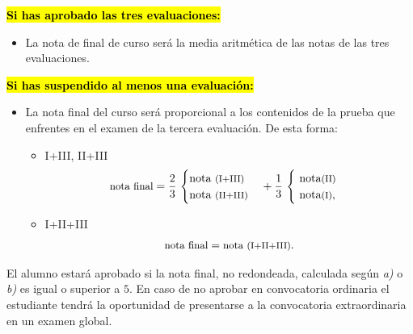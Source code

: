 \documentclass[a5paper,12pt]{extarticle}
\begin{document}
	{\small
	
	\textbf{\hl{Si has aprobado las tres evaluaciones:}}
	\vspace{-1ex}
	
	\begin{itemize}
		\item[\textit{a)}] La nota de final de curso será la media aritm\'etica de las notas de las tres evaluaciones. 
	\end{itemize}
	
	\textbf{\hl{Si has suspendido al menos una evaluaci\'on:}}
	\vspace{-1ex}
	\begin{itemize}
		\item[\textit{b)}] La nota final del curso será proporcional a los contenidos de la prueba que enfrentes en el examen de la tercera evaluación. De esta forma:
			\begin{itemize}
			
				\item \footnotesize{I+III, II+III}
				\[
				\text{\small nota final}=\frac{2}{3}\,
					\begin{cases}
						\text{nota {\footnotesize(I+III)}}\\
						\text{nota {\footnotesize(II+III)}}
					\end{cases}
									+\frac{1}{3}\,
					\begin{cases}
						\text{ nota{\footnotesize(II)}}\\
						\text{ nota{\footnotesize(I)}},
					\end{cases}		
				\]							
				\item \footnotesize{I+II+III}
				\[
				\text{\small nota final}=\text{\small nota \footnotesize{(I+II+III)}}.
				\]
			
			\end{itemize}
	
	\end{itemize}
 }
 
  El alumno estará aprobado si la nota final, no redondeada, calculada según \textit{a)} o  \textit{b)} es igual o superior a $5$. En caso de no aprobar en convocatoria ordinaria el estudiante tendrá la oportunidad de presentarse a la convocatoria extraordinaria en un examen global.
\newpage
\thispagestyle{empty}
\null
\newpage
%
%
%
\small{
\begin{versionhistory}
\end{versionhistory}
	}
	
	
	
\end{document}
